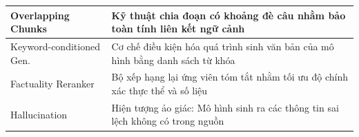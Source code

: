 \begin{longtable}{|>{\raggedright\arraybackslash}p{3.6cm}|>{\raggedright\arraybackslash}p{10.4cm}|}
  Overlapping Chunks        & Kỹ thuật chia đoạn có khoảng đè câu nhằm bảo toàn tính liên kết ngữ cảnh \\ \hline
  Keyword-conditioned Gen.  & Cơ chế điều kiện hóa quá trình sinh văn bản của mô hình bằng danh sách từ khóa \\ \hline
  Factuality Reranker       & Bộ xếp hạng lại ứng viên tóm tắt nhằm tối ưu độ chính xác thực thể và số liệu \\ \hline
  Hallucination             & Hiện tượng ảo giác: Mô hình sinh ra các thông tin sai lệch không có trong nguồn \\ \hline
\end{longtable}

